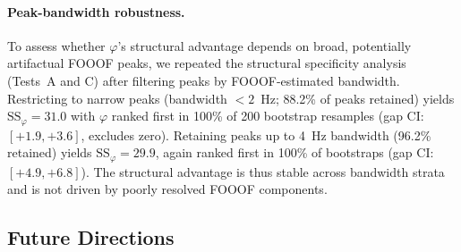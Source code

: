 \documentclass[11pt,a4paper]{article}
\newcommand{\phisym}{\varphi}
\begin{document}
\paragraph{Peak-bandwidth robustness.} To assess whether $\phisym$'s structural advantage depends on broad, potentially artifactual FOOOF peaks, we repeated the structural specificity analysis (Tests~A and C) after filtering peaks by FOOOF-estimated bandwidth. Restricting to narrow peaks (bandwidth $< 2$~Hz; 88.2\% of peaks retained) yields $\text{SS}_\phisym = 31.0$ with $\phisym$ ranked first in 100\% of 200 bootstrap resamples (gap CI: $[+1.9, +3.6]$, excludes zero). Retaining peaks up to 4~Hz bandwidth (96.2\% retained) yields $\text{SS}_\phisym = 29.9$, again ranked first in 100\% of bootstraps (gap CI: $[+4.9, +6.8]$). The structural advantage is thus stable across bandwidth strata and is not driven by poorly resolved FOOOF components.

\subsection{Future Directions}
\label{sec:future}
\end{document}

